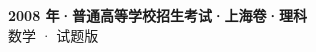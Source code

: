 \documentclass[zihao=-4, a4paper]{ctexart}
\begin{document}
\begin{center}
  {\Large\bfseries 2008 年·普通高等学校招生考试·上海卷·理科}\\[4pt]
  {\large 数学 · 试题版}
\end{center}
\medskip
{}

\end{document}
